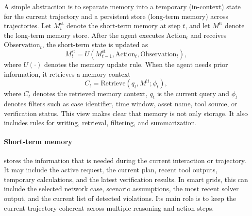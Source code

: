 \documentclass[journal,onecolumn]{IEEEtran} %
\newcommand{\todo}[1]{\color{red}#1\color{black}}
\newcommand{\dani}[1]{\color{blue}#1\color{black}}
\begin{document}
A simple abstraction is to separate memory into a temporary (in-context) state for the current trajectory and a persistent store (long-term memory) across trajectories. {Let $M_t^{\mathrm{st}}$ denote the short-term memory at step $t$, and let $M^{\mathrm{lt}}$ denote the long-term memory store.  After the agent executes $\mathrm{Action}_t$ and receives $\mathrm{Observation}_t$, the short-term state is updated as}
\begin{equation}
M_t^{\mathrm{st}} =
U\!\left(M_{t-1}^{\mathrm{st}}, \mathrm{Action}_t, \mathrm{Observation}_t\right),
\label{eq:stm_update}
\end{equation}
where $U(\cdot)$ denotes the memory update rule. When the agent needs prior information, it retrieves a memory context
\begin{equation}
C_t = \mathrm{Retrieve}(q_t, M^{\mathrm{lt}}; \phi_t),
\label{eq:ltm_retrieval}
\end{equation}
where %
{$C_t$ denotes the retrieved memory context,} $q_t$ is the current query and $\phi_t$ denotes filters such as case identifier, time window, asset name, tool source, or verification status. This view makes clear that memory is not only storage. It also includes rules for writing, retrieval, filtering, and summarization. %


\paragraph{Short-term memory} stores the information that is needed during the current interaction or trajectory. It may include the active request, the current plan, recent tool outputs, temporary calculations, and the latest verification results. In smart grids, this can include the selected network case, scenario assumptions, the most recent solver output, and the current list of detected violations. Its main role is to keep the current trajectory coherent across multiple reasoning and action steps.
\end{document}
